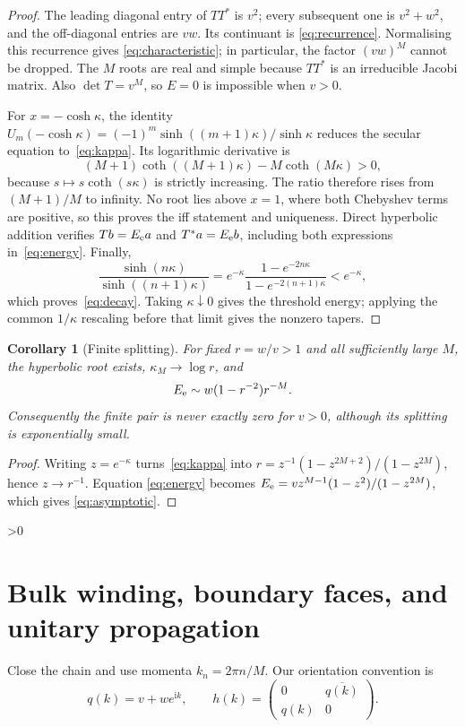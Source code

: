 \documentclass[10pt]{article}
\providecommand{\CRevisionRound}{2}
\newtheorem{corollary}[theorem]{Corollary}
\newcommand{\iu}{\mathrm{i}}
\begin{document}
\begin{proof}
The leading diagonal entry of $TT^*$ is $v^2$; every subsequent one is
$v^2+w^2$, and the off-diagonal entries are $vw$.  Its continuant is
\eqref{eq:recurrence}.  Normalising this recurrence gives
\eqref{eq:characteristic}; in particular, the factor $(vw)^M$ cannot be
dropped.  The $M$ roots are real and simple because $TT^*$ is an irreducible
Jacobi matrix.  Also $\det T=v^M$, so $E=0$ is impossible when $v>0$.

For $x=-\cosh\kappa$, the identity
$U_m(-\cosh\kappa)=(-1)^m\sinh((m+1)\kappa)/\sinh\kappa$ reduces the secular
equation to~\eqref{eq:kappa}.  Its logarithmic derivative is
\[
 (M+1)\coth((M+1)\kappa)-M\coth(M\kappa)>0,
\]
because $s\mapsto s\coth(s\kappa)$ is strictly increasing.  The ratio
therefore rises from $(M+1)/M$ to infinity.  No root lies above $x=1$,
where both Chebyshev terms are positive, so this proves the iff statement
and uniqueness.  Direct hyperbolic addition verifies $Tb=E_{\rm e}a$ and
$T^*a=E_{\rm e}b$, including both expressions in~\eqref{eq:energy}.
Finally,
\[
 \frac{\sinh(n\kappa)}{\sinh((n+1)\kappa)}
 =e^{-\kappa}\frac{1-e^{-2n\kappa}}
 {1-e^{-2(n+1)\kappa}}<e^{-\kappa},
\]
which proves~\eqref{eq:decay}.  Taking $\kappa\downarrow0$ gives the
threshold energy; applying the common $1/\kappa$ rescaling before that limit
gives the nonzero tapers.
\end{proof}

\begin{corollary}[Finite splitting]\label{cor:splitting}
For fixed $r=w/v>1$ and all sufficiently large $M$, the hyperbolic root
exists, $\kappa_M\to\log r$, and
\begin{equation}\label{eq:asymptotic}
 E_{\rm e}\sim w(1-r^{-2})r^{-M}.
\end{equation}
Consequently the finite pair is never exactly zero for $v>0$, although its
splitting is exponentially small.
\end{corollary}
\begin{proof}
Writing $z=e^{-\kappa}$ turns~\eqref{eq:kappa} into
$r=z^{-1}(1-z^{2M+2})/(1-z^{2M})$, hence $z\to r^{-1}$.  Equation
\eqref{eq:energy} becomes
$E_{\rm e}=v z^{M-1}(1-z^2)/(1-z^{2M})$, which gives
\eqref{eq:asymptotic}.
\end{proof}

\ifnum\CRevisionRound>0
\section{Bulk winding, boundary faces, and unitary propagation}
Close the chain and use momenta $k_n=2\pi n/M$.  Our orientation convention is
\begin{equation}\label{eq:bloch}
 q(k)=v+we^{\iu k},\qquad
 h(k)=\begin{pmatrix}0&\overline{q(k)}\\q(k)&0\end{pmatrix}.
\end{equation}
\end{document}
